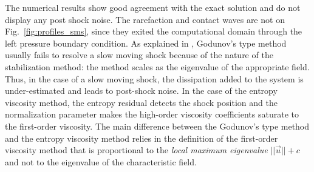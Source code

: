 \documentclass[preprint,10pt]{elsarticle}
\newcommand{\fig}[1]{Fig.~\ref{#1}}                      %
\begin{document}
The numerical results show good agreement with the exact solution and do not display any post shock noise. The rarefaction and contact waves are not on \fig{fig:profiles_sms}, since they exited the computational domain through the left pressure boundary condition. As explained in \cite{roberts}, Godunov's type method usually fails to resolve a slow moving shock because of the nature of the stabilization method: the method scales as the eigenvalue of the appropriate field. Thus, in the case of a slow moving shock, the dissipation added to the system is under-estimated and leads to post-shock noise. In the case of the entropy viscosity method, the entropy residual detects the shock position and the normalization parameter makes the high-order viscosity coefficients saturate to the first-order viscosity. The main difference between the Godunov's type method and the entropy viscosity method relies in the definition of the first-order viscosity method that is proportional to the \emph{local maximum eigenvalue} $||\vec{u}||+c$ and not to the eigenvalue of the characteristic field.
\end{document}
